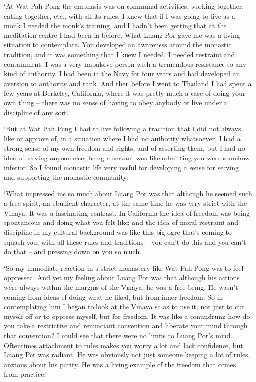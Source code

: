 `At Wat Pah Pong the emphasis was on communal activities, working
together, eating together, etc., with all its rules. I knew that if I
was going to live as a monk I needed the monk's training, and I hadn't
been getting that at the meditation centre I had been in before. What
Luang Por gave me was a living situation to contemplate. You developed
an awareness around the monastic tradition, and it was something that I
knew I needed. I needed restraint and containment. I was a very
impulsive person with a tremendous resistance to any kind of authority. 
I had been in the Navy for four years and had developed an aversion to
authority and rank. And then before I went to Thailand I had spent a few
years at Berkeley, California, where it was pretty much a case of doing
your own thing -- there was no sense of having to obey anybody or live
under a discipline of any sort.

`But at Wat Pah Pong I had to live
following a tradition that I did not always like or approve of, in a
situation where I had no authority whatsoever. I had a strong sense of
my own freedom and rights, and of asserting them, but I had no idea of
serving anyone else; being a servant was like admitting you were somehow
inferior. So I found monastic life very useful for developing a sense
for serving and supporting the monastic community.

`What impressed me so much about Luang Por was that although he seemed
such a free spirit, an ebullient character, at the same time he was very
strict with the Vinaya. It was a fascinating contrast. In California the
idea of freedom was being spontaneous and doing what you felt like; and
the idea of moral restraint and discipline in my cultural background was
like this big ogre that's coming to squash you, with all these rules and
traditions -- you can't do this and you can't do that -- and pressing
down on you so much.

`So my immediate reaction in a strict monastery like Wat Pah Pong was to
feel oppressed. And yet my feeling about Luang Por was that although his
actions were always within the margins of the Vinaya, he was a free
being. He wasn't coming from ideas of doing what he liked, but from
inner freedom. So in contemplating him I began to look at the Vinaya so
as to use it, not just to cut myself off or to oppress myself, but for
freedom. It was like a conundrum: how do you take a restrictive and
renunciant convention and liberate your mind through that convention? I
could see that there were no limits to Luang Por's mind. Oftentimes
attachment to rules makes you worry a lot and lack confidence, but Luang
Por was radiant. He was obviously not just someone keeping a lot of
rules, anxious about his purity. He was a living example of the freedom
that comes from practice.'

